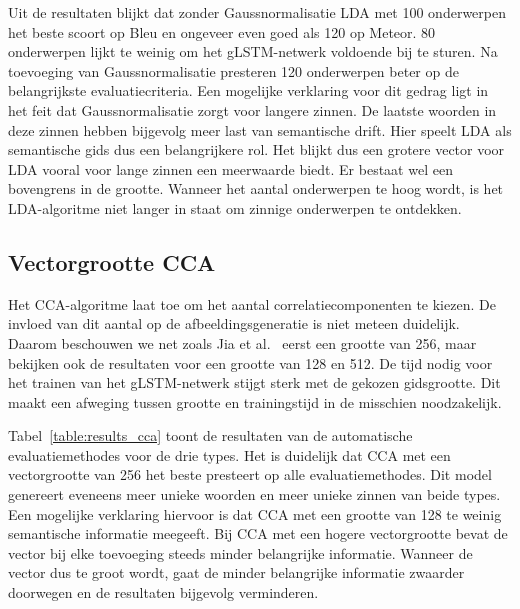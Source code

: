 Uit de resultaten blijkt dat zonder Gaussnormalisatie LDA met 100 onderwerpen het beste scoort op Bleu en ongeveer even goed als 120 op Meteor. 80 onderwerpen lijkt te weinig om het gLSTM-netwerk voldoende bij te sturen. Na toevoeging van Gaussnormalisatie presteren 120 onderwerpen beter op de belangrijkste evaluatiecriteria. Een mogelijke verklaring voor dit gedrag ligt in het feit dat Gaussnormalisatie zorgt voor langere zinnen. De laatste woorden in deze zinnen hebben bijgevolg meer last van semantische drift. Hier speelt LDA als semantische gids dus een belangrijkere rol. Het blijkt dus een grotere vector voor LDA vooral voor lange zinnen een meerwaarde biedt. Er bestaat wel een bovengrens in de grootte. Wanneer het aantal onderwerpen te hoog wordt, is het LDA-algoritme niet langer in staat om zinnige onderwerpen te ontdekken.

\subsection{Vectorgrootte CCA} 
Het CCA-algoritme laat toe om het aantal correlatiecomponenten te kiezen. De invloed van dit aantal op de afbeeldingsgeneratie is niet meteen duidelijk. Daarom beschouwen we net zoals Jia et al.~\cite{Fernando2015} eerst een grootte van 256, maar bekijken ook de resultaten voor een grootte van 128 en 512. De tijd nodig voor het trainen van het gLSTM-netwerk stijgt sterk met de gekozen gidsgrootte. Dit maakt een afweging tussen grootte en trainingstijd in de misschien noodzakelijk.

Tabel~\ref{table:results_cca} toont de resultaten van de automatische evaluatiemethodes voor de drie types. Het is duidelijk dat CCA met een vectorgrootte van 256 het beste presteert op alle evaluatiemethodes. Dit model genereert eveneens meer unieke woorden en meer unieke zinnen van beide types. Een mogelijke verklaring hiervoor is dat CCA met een grootte van 128 te weinig semantische informatie meegeeft. Bij CCA met een hogere vectorgrootte bevat de vector bij elke toevoeging steeds minder belangrijke informatie. Wanneer de vector dus te groot wordt, gaat de minder belangrijke informatie zwaarder doorwegen en de resultaten bijgevolg verminderen.

